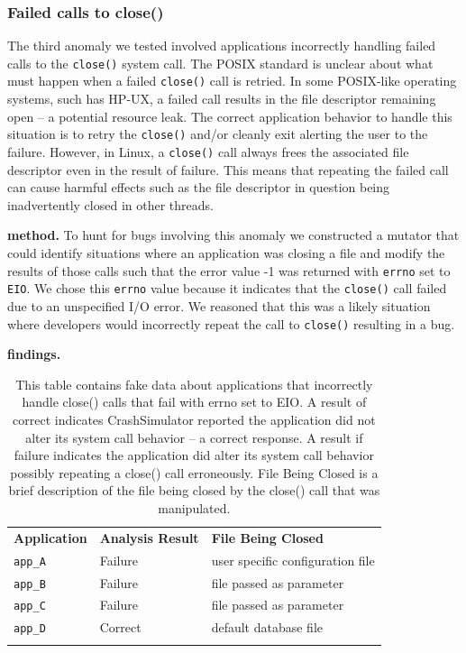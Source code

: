 \subsubsection{Failed calls to close()}
\label{sec-close-failed}

The third anomaly we tested involved applications incorrectly handling
failed calls to the {\tt close()} system call.  The POSIX standard is
unclear about what must happen when a failed {\tt close()} call is
retried.  In some POSIX-like operating systems, such has
HP-UX, a failed call results in the file descriptor remaining open -- a
potential resource leak.  The correct application behavior to handle this
situation is to retry the {\tt close()} and/or cleanly exit alerting the
user to the failure.  However, in Linux, a {\tt close()} call always frees
the associated file descriptor even in the result of failure.  This means
that repeating the failed call can cause harmful effects such as the file
descriptor in question being inadvertently closed in other
threads.

{\bf method.}  To hunt for bugs involving this anomaly we constructed a
mutator that could identify situations where an application was closing a
file and modify the results of those calls such that the error value -1 was
returned with {\tt errno} set to {\tt EIO}.  We chose this {\tt errno}
value because it indicates that the {\tt close()} call failed due to an
unspecified I/O error.  We
reasoned that this was a likely situation where developers would
incorrectly repeat the call to {\tt close()} resulting in a bug.

{\bf findings.}

\begin{table}[t]
  \scriptsize{}
  \begin{tabular}{l | l | l}
    \toprule{}
      {\bf Application} & {\bf Analysis Result} & {\bf File Being Closed}\\
      {\tt app\_A} & Failure & user specific configuration file\\
      {\tt app\_B} & Failure & file passed as parameter \\
      {\tt app\_C} & Failure & file passed as parameter \\
      {\tt app\_D} & Correct &  default database file\\
    \bottomrule{}
  \end{tabular}
    \caption{This table contains fake data about applications that
    incorrectly handle close() calls that fail with errno set to EIO.  A
    result of correct indicates CrashSimulator reported  the application
    did not alter its system call behavior -- a correct response.  A result
    if failure indicates the application did alter its system call behavior
    possibly repeating a close() call erroneously.  File Being Closed is a
    brief description of the file being closed by the close() call that was
    manipulated.}
  \label{table:failedclose}
\end{table}

